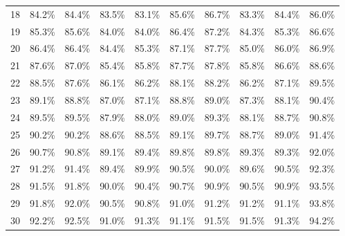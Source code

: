 \begin{table}[h]
\begin{center}
\begin{tabular}{c|p{1.2cm}p{1.1cm}p{1.1cm}p{1.7cm}p{1.5cm}p{1.2cm}p{1.2cm}p{1.2cm}p{1.2cm}}
	18 & 84.2\% & 84.4\% & 83.5\% & 83.1\% & 85.6\% & 86.7\% & 83.3\% & 84.4\% & 86.0\% \\ 
	19 & 85.3\% & 85.6\% & 84.0\% & 84.0\% & 86.4\% & 87.2\% & 84.3\% & 85.3\% & 86.6\% \\ 
	20 & 86.4\% & 86.4\% & 84.4\% & 85.3\% & 87.1\% & 87.7\% & 85.0\% & 86.0\% & 86.9\% \\ 
	21 & 87.6\% & 87.0\% & 85.4\% & 85.8\% & 87.7\% & 87.8\% & 85.8\% & 86.6\% & 88.6\% \\ 
	22 & 88.5\% & 87.6\% & 86.1\% & 86.2\% & 88.1\% & 88.2\% & 86.2\% & 87.1\% & 89.5\% \\ 
	23 & 89.1\% & 88.8\% & 87.0\% & 87.1\% & 88.8\% & 89.0\% & 87.3\% & 88.1\% & 90.4\% \\ 
	24 & 89.5\% & 89.5\% & 87.9\% & 88.0\% & 89.0\% & 89.3\% & 88.1\% & 88.7\% & 90.8\% \\ 
	25 & 90.2\% & 90.2\% & 88.6\% & 88.5\% & 89.1\% & 89.7\% & 88.7\% & 89.0\% & 91.4\% \\ 
	26 & 90.7\% & 90.8\% & 89.1\% & 89.4\% & 89.8\% & 89.8\% & 89.3\% & 89.3\% & 92.0\% \\ 
	27 & 91.2\% & 91.4\% & 89.4\% & 89.9\% & 90.5\% & 90.0\% & 89.6\% & 90.5\% & 92.3\% \\ 
	28 & 91.5\% & 91.8\% & 90.0\% & 90.4\% & 90.7\% & 90.9\% & 90.5\% & 90.9\% & 93.5\% \\ 
	29 & 91.8\% & 92.0\% & 90.5\% & 90.8\% & 91.0\% & 91.2\% & 91.2\% & 91.1\% & 93.8\% \\ 
	30 & 92.2\% & 92.5\% & 91.0\% & 91.3\% & 91.1\% & 91.5\% & 91.5\% & 91.3\% & 94.2\% \\
	\hline\hline
    \end{tabular}
    \label{tab:media_fisher}
    \end{center}
\end{table}

